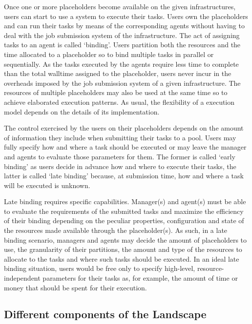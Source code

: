 \documentclass{sig-alternate}
\begin{document}

Once one or more placeholders become available on the given
infrastructures, users can start to use a \pilotjob system to execute
their tasks. Users own the placeholders and can run their tasks by means
of the corresponding agents without having to deal with the job
submission system of the infrastructure. The act of assigning tasks to
an agent is called `binding'. Users partition both the resources and
the time allocated to a placeholder so to bind multiple tasks in
parallel or sequentially. As the tasks executed by the agents require
less time to complete than the total walltime assigned to the
placeholder, users never incur in the overheads imposed by the job
submission system of a given infrastructure. The resources of multiple
placeholders may also be used at the same time so to achieve elaborated
execution patterns. As usual, the flexibility of a \pilotjob execution
model depends on the details of its implementation.

The control exercised by the users on their placeholders depends on the
amount of information they include when submitting their tasks to a
pool. Users may fully specify how and where a task should be executed or
may leave the manager and agents to evaluate those parameters for them.
The former is called `early binding' as users decide in advance how
and where to execute their tasks, the latter is called `late binding'
because, at submission time, how and where a task will be executed is
unknown.

Late binding requires specific capabilities. Manager(s) and agent(s)
must be able to evaluate the requirements of the submitted tasks and
maximize the efficiency of their binding depending on the peculiar
properties, configuration and state of the resources made available
through the placeholder(s). As such, in a late binding scenario,
managers and agents may decide the amount of placeholders to use, the
granularity of their partitions, the amount and type of the resources to
allocate to the tasks and where such tasks should be executed. In an
ideal late binding situation, users would be free only to specify
high-level, resource-independent parameters for their tasks as, for
example, the amount of time or money that should be spent for their
execution.


\subsection{Different components of the Landscape}
\end{document}

